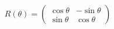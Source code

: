 \documentclass[preview]{standalone}
\begin{document}
\begin{align*}
R(\theta) = \begin{pmatrix} \cos\theta & -\sin\theta \\ \sin\theta & \cos\theta \end{pmatrix}
\end{align*}
\end{document}
